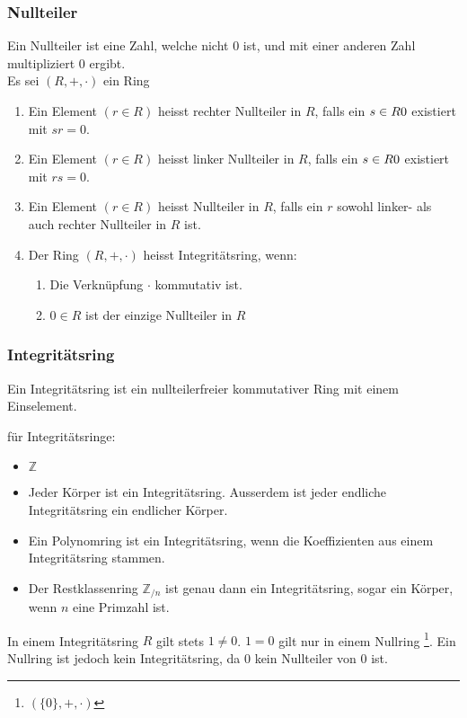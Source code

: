 \subsubsection*{Nullteiler}
\begin{definition}
Ein Nullteiler ist eine Zahl, welche nicht 0 ist, und mit einer anderen Zahl multipliziert 0 ergibt.\\
Es sei $(R, +, \cdot)$ ein Ring
	\begin{enumerate}
		\item Ein Element $(r \in R)$ heisst rechter Nullteiler in $R$, falls ein $s \in R\\{0}$ existiert mit $sr = 0$.
		\item Ein Element $(r \in R)$ heisst linker Nullteiler in $R$, falls ein $s \in R\\{0}$ existiert mit $rs = 0$.
		\item Ein Element $(r \in R)$ heisst Nullteiler in $R$, falls ein $r$ sowohl linker- als auch rechter Nullteiler in $R$ ist.
		\item Der Ring $(R, +, \cdot)$ heisst Integritätsring, wenn:
		\begin{enumerate}
			\item Die Verknüpfung $\cdot$ kommutativ ist.
			\item $0 \in R$ ist der einzige Nullteiler in $R$
		\end{enumerate}
	\end{enumerate}
\end{definition}

\subsubsection*{Integritätsring}
Ein Integritätsring ist ein nullteilerfreier kommutativer Ring mit einem Einselement.
\begin{bsp} für Integritätsringe:
\begin{itemize}
	\item $\mathbb{Z}$
	\item Jeder Körper ist ein Integritätsring. Ausserdem ist jeder endliche Integritätsring ein endlicher Körper.
	\item Ein Polynomring ist ein Integritätsring, wenn die Koeffizienten aus einem Integritätsring stammen.
	\item Der Restklassenring $\mathbb{Z}_{/n}$  ist genau dann ein Integritätsring, sogar ein Körper, wenn $n$ eine Primzahl ist.
\end{itemize}
\end{bsp} 
 \begin{bem}
In einem Integritätsring $R$ gilt stets $1 \neq 0$. $1=0$ gilt nur in einem Nullring \footnote{$(\{0\}, +, \cdot)$}. Ein Nullring ist jedoch kein Integritätsring, da $0$ kein Nullteiler von $0$ ist.
\end{bem}

